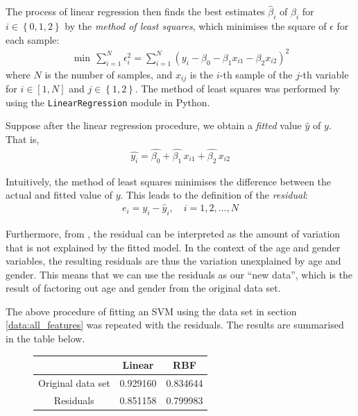 \documentclass[12pt, twoside, a4paper]{report}
\begin{document}
The process of linear regression then finds the best estimates $\widehat{\beta}_i$ of $\beta_i$ for $i \in \left\lbrace 0,1,2 \right\rbrace$ by the \textit{method of least squares}, which minimises the square of $\epsilon$ for each sample:
\begin{align*}
\min \, \sum_{i=1}^N \epsilon_i^2 = \sum_{i=1}^N \left( y_i - \beta_0 - \beta_1x_{i1} - \beta_2x_{i2} \right)^2
\end{align*}
where $N$ is the number of samples, and $x_{ij}$ is the $i$-th sample of the $j$-th variable for $i \in [1,N]$ and $j \in \left\lbrace 1,2 \right\rbrace$. The method of least squares was performed by using the \texttt{LinearRegression} module in Python.

Suppose after the linear regression procedure, we obtain a \textit{fitted} value $\widehat{y}$ of $y$. That is,
\begin{align*}
\widehat{y_i} = \widehat{\beta_0} + \widehat{\beta_1} \, x_{i1} + \widehat{\beta_2} \, x_{i2}
\end{align*}

Intuitively, the method of least squares minimises the difference between the actual and fitted value of $y$. This leads to the definition of the \textit{residual}:
\begin{align*}
e_i = y_i - \widehat{y}_i, \quad i=1,2,\dots,N
\end{align*}

Furthermore, from \cite{RefWorks:252}, the residual can be interpreted as the amount of variation that is not explained by the fitted model. In the context of the age and gender variables, the resulting residuals are thus the variation unexplained by age and gender. This means that we can use the residuals as our ``new data'', which is the result of factoring out age and gender from the original data set.

The above procedure of fitting an SVM using the data set in section \ref{data:all_features} was repeated with the residuals. The results are summarised in the table below.

\begin{figure}[h]
\begin{center}
    \begin{tabular}{| c | c | c | } \hline
      & Linear & RBF \\ \hline
    Original data set & 0.929160 & 0.834644 \\ \hline
	Residuals & 0.851158  & 0.799983 \\ \hline
    \end{tabular}
\end{center}
\end{figure}
\end{document}
